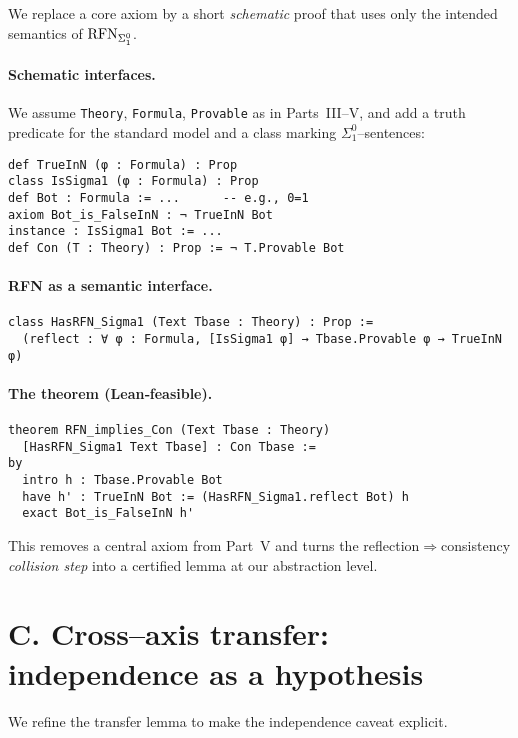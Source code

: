 \documentclass[11pt]{article}
\theoremstyle{definition}
\theoremstyle{remark}
\begin{document}
We replace a core axiom by a short \emph{schematic} proof that uses only the intended semantics of $\mathrm{RFN}_{\Sigma^0_1}$.

\paragraph{Schematic interfaces.}
We assume \texttt{Theory}, \texttt{Formula}, \texttt{Provable} as in Parts~III–V, and add a truth predicate for the standard model and a class marking $\Sigma^0_1$–sentences:
\begin{verbatim}
def TrueInN (φ : Formula) : Prop
class IsSigma1 (φ : Formula) : Prop
def Bot : Formula := ...      -- e.g., 0=1
axiom Bot_is_FalseInN : ¬ TrueInN Bot
instance : IsSigma1 Bot := ...
def Con (T : Theory) : Prop := ¬ T.Provable Bot
\end{verbatim}

\paragraph{RFN as a semantic interface.}
\begin{verbatim}
class HasRFN_Sigma1 (Text Tbase : Theory) : Prop :=
  (reflect : ∀ φ : Formula, [IsSigma1 φ] → Tbase.Provable φ → TrueInN φ)
\end{verbatim}

\paragraph{The theorem (Lean‑feasible).}
\begin{verbatim}
theorem RFN_implies_Con (Text Tbase : Theory)
  [HasRFN_Sigma1 Text Tbase] : Con Tbase :=
by
  intro h : Tbase.Provable Bot
  have h' : TrueInN Bot := (HasRFN_Sigma1.reflect Bot) h
  exact Bot_is_FalseInN h'
\end{verbatim}

\noindent
This removes a central axiom from Part~V and turns the reflection\(\Rightarrow\)consistency \emph{collision step} into a certified lemma at our abstraction level.

\section{C. Cross–axis transfer: independence as a hypothesis}

We refine the transfer lemma to make the independence caveat explicit.
\end{document}
